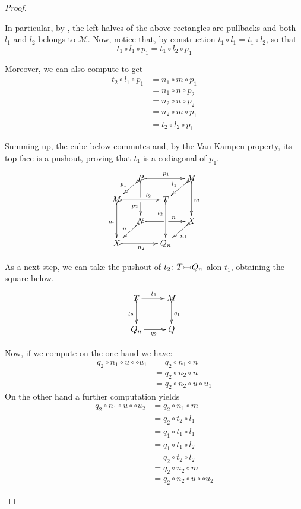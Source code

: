 \begin{proof}
\begin{enumerate}
		In particular, by , the left halves of the above rectangles are pullbacks and both $l_1$ and $l_2$ belongs to $\mathcal{M}$. Now, notice that, by construction $t_1\circ l_1=t_1\circ l_2$, so that
		\[	t_1\circ l_1\circ p_1=	t_1\circ l_2\circ p_1\]
		
		Moreover, we can also compute to get
		\begin{align*}
		t_2\circ l_1\circ p_1&=n_1\circ m \circ p_1\\&=n_1\circ n\circ p_2\\&=n_2\circ n\circ p_2\\&=n_2\circ m\circ p_1\\&= t_2\circ l_2\circ p_1
		\end{align*} 
		
		Summing up, the cube below commutes and,  by the Van Kampen property, its top face is a pushout, proving that $t_1$ is a codiagonal of $p_1$.
		\[\xymatrix@C=13pt@R=13pt{&P\ar@{>->}[dd]|\hole_(.65){p_2}\ar@{>->}[rr]^{p_1} \ar@{>->}[dl]_{p_1} && M \ar@{>->}[dd]^{m} \ar@{>->}[dl]_{l_1}\\ M  \ar@{>->}[dd]_{m}\ar@{>->}[rr]^(.65){l_2} & & T\ar@{>->}[dd]_(.3){t_2}\\&N\ar@{>->}[rr]|\hole^(.65){n} \ar@{>->}[dl]_{n} && X \ar@{>->}[dl]^{n_1} \\X \ar@{>->}[rr]_{n_2} & & Q_n}\]
		
		As a next step, we can take the pushout of $t_2\colon T\mto Q_n$ alon $t_1$, obtaining the square below.
		\[\xymatrix{T \ar[r]^{t_1} \ar@{>->}[d]_{t_2}& M \ar@{>->}[d]^{q_1}\\ Q_n \ar[r]_{q_2} & Q }\]
		
		Now, if we compute on the one hand we have:
		\begin{align*}
			q_2\circ n_1\circ u \circ \circ u_1&=q_2\circ n_1\circ n\\&=q_2\circ n_2\circ n\\&=q_2\circ n_2 \circ u\circ u_1
		\end{align*}
		On the other hand a further computation yields
		\begin{align*}
		q_2\circ n_1\circ u \circ \circ u_2&=q_2\circ n_1\circ m\\&=q_2\circ t_2\circ l_1\\&=q_1\circ t_1 \circ l_1\\&=q_1\circ t_1\circ l_2\\&=q_2\circ t_2\circ l_2\\&=q_2\circ n_2\circ m\\&=q_2\circ n_2\circ u \circ \circ u_2
		\end{align*}
		

\end{enumerate}
\end{proof}
